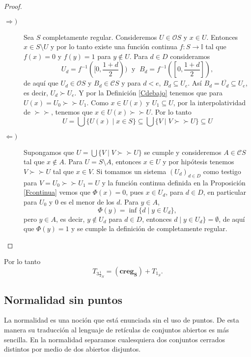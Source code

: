 \documentclass{comunicaciones}
\begin{document}
\begin{proof}
    \begin{description}
        \item[$\Rightarrow )$] Sea $S$ completamente regular. Consideremos $U\in\mathcal{O}S$ y $x\in U$. Entonces $x\in S\setminus U$ y por lo tanto existe una función continua $f\colon S\to \mathbb{I}$ tal que $f(x)=0$ y $f(y)=1$ para $y\notin U$. Para $d\in D$ consideramos
        \[
        U_d=f^{-1}([0, \frac{1+d}{2}))\;\mbox{ y } \;B_d=f^{-1}([0,\frac{1+d}{2}]),
        \]
        de aquí que $U_d\in \mathcal{O}S$ y $B_d\in \mathcal{C}S$ y para $d<e$, $B_d\subseteq U_e$. Así $B_d=\overline{U_d}\subseteq U_e$, es decir, $U_d\succ U_e$. Y por la Definición \ref{Cdebajo} tenemos que para $U(x)=U_0\succ\succ U_1$. Como $x\in U(x)$ y $U_1\subseteq U$, por la interpolatividad de $\succ\succ$, tenemos que $x\in U(x)\succ\succ U$. Por lo tanto
        \[
        U=\bigcup \{U(x)\mid x\in S\}\subseteq \bigcup \{V\mid V\succ\succ U\}\subseteq U
        \]
        \item[$\Leftarrow )$] Supongamos que $U=\bigcup\{V\mid V\succ\succ U\}$ se cumple y consideremos $A\in\mathcal{C}S$ tal que $x\notin A$. Para $U=S\setminus A$, entonces $x\in U$ y por  hipótesis tenemos $V\succ\succ U$ tal que $x\in V$. Si tomamos un sistema $(U_d)_{d\in D}$ como testigo para $V=U_0\succ \succ U_1=U$ y la función continua definida en la Proposición \ref{Fcontinua} vemos que $\Phi(x)=0$, pues $x\in U_d$, para $d\in D$, en particular para $U_0$ y $0$ es el menor de los $d$. Para $y\in A$, 
        \[
        \Phi(y)=\inf\{d\mid y\in U_d\},
        \]
        pero $y\in A$, es decir, $y\notin U_d$ para $d\in D$, entonces $d\mid y\in U_d\}=\emptyset$, de aquí que $\Phi(y)=1$ y se cumple la definición de completamente regular.
    \end{description}
\end{proof}
Por lo tanto 
\[
T_{3\frac{1}{2}_S}=(\mathbf{creg_S})+T_{1_S}.
\]

\subsection{Normalidad sin puntos}

La normalidad es una noción que está enunciada sin el uso de puntos. De esta manera su traducción al lenguaje de retículas de conjuntos abiertos es más sencilla. En la normalidad separamos cualesquiera dos conjuntos cerrados distintos por medio de dos abiertos disjuntos.\\
\end{document}
